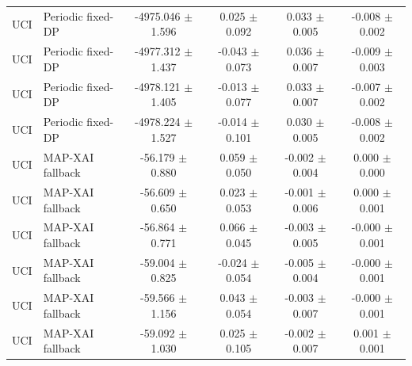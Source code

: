 \begin{tabular}{llcccc}
UCI & Periodic fixed-DP & -4975.046 $\pm$ 1.596 & 0.025 $\pm$ 0.092 & 0.033 $\pm$ 0.005 & -0.008 $\pm$ 0.002 \\
UCI & Periodic fixed-DP & -4977.312 $\pm$ 1.437 & -0.043 $\pm$ 0.073 & 0.036 $\pm$ 0.007 & -0.009 $\pm$ 0.003 \\
UCI & Periodic fixed-DP & -4978.121 $\pm$ 1.405 & -0.013 $\pm$ 0.077 & 0.033 $\pm$ 0.007 & -0.007 $\pm$ 0.002 \\
UCI & Periodic fixed-DP & -4978.224 $\pm$ 1.527 & -0.014 $\pm$ 0.101 & 0.030 $\pm$ 0.005 & -0.008 $\pm$ 0.002 \\
UCI & MAP-XAI fallback & -56.179 $\pm$ 0.880 & 0.059 $\pm$ 0.050 & -0.002 $\pm$ 0.004 & 0.000 $\pm$ 0.000 \\
UCI & MAP-XAI fallback & -56.609 $\pm$ 0.650 & 0.023 $\pm$ 0.053 & -0.001 $\pm$ 0.006 & 0.000 $\pm$ 0.001 \\
UCI & MAP-XAI fallback & -56.864 $\pm$ 0.771 & 0.066 $\pm$ 0.045 & -0.003 $\pm$ 0.005 & -0.000 $\pm$ 0.001 \\
UCI & MAP-XAI fallback & -59.004 $\pm$ 0.825 & -0.024 $\pm$ 0.054 & -0.005 $\pm$ 0.004 & -0.000 $\pm$ 0.001 \\
UCI & MAP-XAI fallback & -59.566 $\pm$ 1.156 & 0.043 $\pm$ 0.054 & -0.003 $\pm$ 0.007 & -0.000 $\pm$ 0.001 \\
UCI & MAP-XAI fallback & -59.092 $\pm$ 1.030 & 0.025 $\pm$ 0.105 & -0.002 $\pm$ 0.007 & 0.001 $\pm$ 0.001 \\
\bottomrule
\end{tabular}
